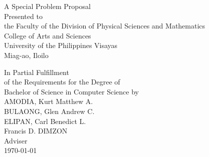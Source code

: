 \begin{titlepage}
\centering


\vspace{1.75cm}
A Special Problem Proposal\\
Presented to\\
the Faculty of the Division of Physical Sciences and Mathematics\\
College of Arts and Sciences\\
University of the Philippines Visayas\\
Miag-ao, Iloilo

\vspace{1.75cm}
In Partial Fulfillment\\
of the Requirements for the Degree of\\
Bachelor of Science in Computer Science
\vspace{1.75cm}
by\\

\vspace{1cm}
AMODIA, Kurt Matthew A.  \\
BULAONG, Glen Andrew C. \\
ELIPAN, Carl Benedict L.   \\

\vspace{1.75cm}
Francis D. DIMZON\\
Adviser\\

\vspace{1.75cm}
\today
\end{titlepage}
